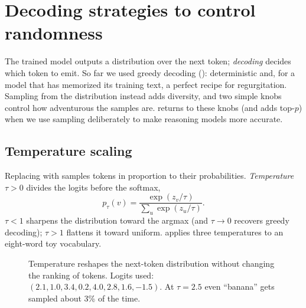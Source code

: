 \section{Decoding strategies to control randomness}\label{sec:pretrain:decoding}

The trained model outputs a distribution over the next token; \emph{decoding} decides which
token to emit. So far we used greedy decoding (): deterministic and, for a model
that has memorized its training text, a perfect recipe for regurgitation. Sampling from the
distribution instead adds diversity, and two simple knobs control how adventurous the samples
are.  returns to these knobs (and adds top-$p$) when we use sampling
deliberately to make reasoning models more accurate.

\subsection{Temperature scaling}\label{sec:pretrain:temp}

Replacing  with  samples tokens in proportion
to their probabilities. \emph{Temperature} $\tau>0$ divides the logits before the softmax,
\begin{equation}
p_\tau(v) = \frac{\exp(z_v/\tau)}{\sum_u \exp(z_u/\tau)}.
\end{equation}
$\tau<1$ sharpens the distribution toward the argmax (and $\tau\to0$ recovers greedy
decoding); $\tau>1$ flattens it toward uniform.  applies three
temperatures to an eight-word toy vocabulary.

\begin{figure}[t]
\centering
{}
\caption{Temperature reshapes the next-token distribution without changing the ranking of
tokens. Logits used: $(2.1,1.0,3.4,0.2,4.0,2.8,1.6,-1.5)$. At $\tau=2.5$ even ``banana''
gets sampled about 3\% of the time.}
\label{fig:pretrain:temperature}
\end{figure}

